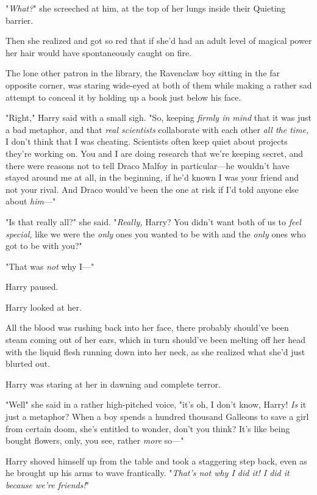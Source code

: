"\emph{What?}" she screeched at him, at the top of her lungs inside their
Quieting barrier.

Then she realized and got so red that if she'd had an adult level of magical
power her hair would have spontaneously caught on fire.

The lone other patron in the library, the Ravenclaw boy sitting in the far
opposite corner, was staring wide-eyed at both of them while making a rather
sad attempt to conceal it by holding up a book just below his face.

"Right," Harry said with a small sigh. "So, keeping \emph{firmly in mind} that
it was just a bad metaphor, and that \emph{real scientists} collaborate with
each other \emph{all the time,} I don't think that I was cheating. Scientists
often keep quiet about projects they're working on. You and I are doing
research that we're keeping secret, and there were reasons not to tell Draco
Malfoy in particular---he wouldn't have stayed around me at all, in the
beginning, if he'd known I was your friend and not your rival. And Draco
would've been the one at risk if I'd told anyone else about \emph{him}\mbox{---}"

"Is that really all?" she said. "\emph{Really,} Harry? You didn't want both of
us to \emph{feel special,} like we were the \emph{only} ones you wanted to be
with and the \emph{only} ones who got to be with you?"

"That was \emph{not} why I\mbox{---}"

Harry paused.

Harry looked at her.

All the blood was rushing back into her face, there probably should've been
steam coming out of her ears, which in turn should've been melting off her head
with the liquid flesh running down into her neck, as she realized what she'd
just blurted out.

Harry was staring at her in dawning and complete terror.

"Well{\el}" she said in a rather high-pitched voice, "it's{\el} oh, I
don't know, Harry! \emph{Is} it just a metaphor? When a boy spends a hundred
thousand Galleons to save a girl from certain doom, she's entitled to wonder,
don't you think? It's like being bought flowers, only, you see, rather
\emph{more} so\mbox{---}"

Harry shoved himself up from the table and took a staggering step back, even as
he brought up his arms to wave frantically. "\emph{That's not why I did it! I
did it because we're friends!}"

